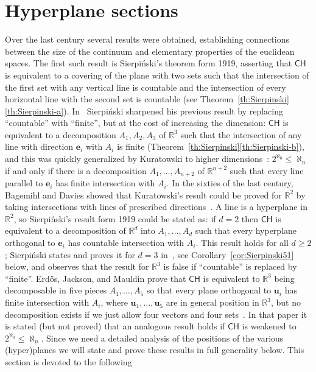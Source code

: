 \documentclass[12pt]{amsart}
\newcommand{\CH}{{\mathsf{CH}}}	%
\newcommand{\R}{\mathbb{R}}	%
\theoremstyle{plain}
\theoremstyle{definition}
\theoremstyle{remark}
\begin{document}
\section{Hyperplane sections}\label{sec:Hyperplane-sections}
Over the last century several results were obtained, establishing connections between the size of the continuum and elementary properties of the euclidean spaces.
The first such result is Sierpiński's theorem form 1919, asserting that \( \CH \) is equivalent to a covering of the plane with two sets such that the intersection of the first set with any vertical line is countable and the intersection of every horizontal line with the second set is countable (see Theorem~\ref{th:Sierpinski}\ref{th:Sierpinski-a}).
In~\cite{Sierpinski:1951aa} Sierpiński sharpened his previous result by replacing ``countable'' with ``finite'', but at the cost of increasing the dimension: \( \CH \) is equivalent to a decomposition \( A_1 , A_2 , A_3 \) of \( \R^3 \) such that the intersection of any line with direction \( \mathbf{e}_i \) with \( A_i \) is finite (Theorem~\ref{th:Sierpinski}\ref{th:Sierpinski-b}), and this was quickly generalized by Kuratowski to higher dimensions~\cite{Kuratowski:1951aa}: \( 2^{\aleph_0 } \leq \aleph_n \) if and only if there is a decomposition \( A_1 , \dots , A_{ n + 2} \) of \( \R^{ n + 2 } \) such that every line parallel to \( \mathbf{e}_i \) has finite intersection with \( A_i \).
In the sixties of the last century, Bagemihl and Davies showed that Kuratowski's result could be proved for \( \R^2 \) by taking intersections with lines of prescribed directions~\cite{Bagemihl:1960ti,Bagemihl:1961ve,Davies:1962ly,Davies:1963zr,Bagemihl:1968up}.
A line is a hyperplane in \( \R^2 \), so Sierpiński's result form 1919 could be stated as: if \( d = 2 \) then \( \CH \) is equivalent to a decomposition of \( \R^d \) into \( A_1 , \dots , A_d \) such that every hyperplane orthogonal to \( \mathbf{e}_i \) has countable intersection with \( A_i \).
This result holds for all \( d \geq 2 \); Sierpiński states and proves it for \( d = 3 \) in~\cite{Sierpinski:1951aa}, see Corollary~\ref{cor:Sierpinski51} below, and observes that the result for \( \R^3 \) is false if ``countable'' is replaced by ``finite''.
Erd\H{o}s, Jackson, and Mauldin prove that \( \CH \) is equivalent to \( \R^3 \) being decomposable in five pieces \( A_1 , \dots , A_5 \) so that every plane orthogonal to \( \mathbf{u}_i \) has finite intersection with \( A_i \), where \( \mathbf{u}_1 , \dots , \mathbf{u}_5 \) are in general position in \( \R^3 \), but no decomposition exists if we just allow four vectors and four sets~\cite[Corollary 6, Lemma 1]{Erdos:1994yq}. 
In that paper it is stated (but not proved) that an analogous result holds if \( \CH \) is weakened to \( 2^{\aleph_0} \leq \aleph_n \).
Since we need a detailed analysis of the positions of the various (hyper)planes we will state and prove these results in full generality below.
This section is devoted to the following
\end{document}
